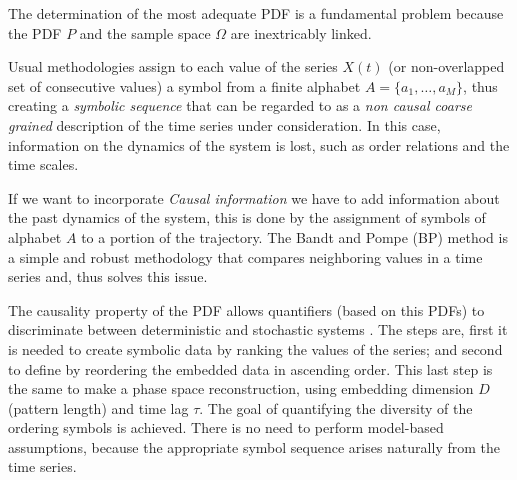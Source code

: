 The determination of the most adequate PDF is a fundamental problem because the PDF $P$ and the sample space $\Omega$ are inextricably linked.

Usual methodologies assign to each value of the series $X(t)$ (or non-overlapped set of consecutive values) a symbol from a finite alphabet $A=\{a_1,\dots,a_M\}$, thus creating a {\it symbolic sequence} that can be regarded to as a {\it non causal coarse grained\/} description of the time series under consideration. 
In this case, information on the dynamics of the system is lost, such as order relations and the time scales.

If we want to incorporate {\it Causal information\/} we have to add information about the past dynamics of the system, this is done by the assignment of symbols of alphabet $A$ to a portion of the trajectory.
The Bandt and Pompe (BP) \cite{Bandt2002} method is a simple and robust methodology that compares neighboring values in a time series and, thus solves this issue.

The causality property of the PDF allows quantifiers (based on this PDFs) to discriminate between deterministic and stochastic systems \cite{Rosso2007B}.
The steps are, first it is needed to create  symbolic data by ranking the values of the series; and second to define by reordering the embedded data in ascending order.
This last step is the same to make a phase space reconstruction, using embedding dimension $D$ (pattern length) and time lag $\tau$.
The goal of quantifying the diversity of the ordering symbols is achieved.
There is no need to perform model-based assumptions, because the appropriate symbol sequence arises naturally from the time series.

